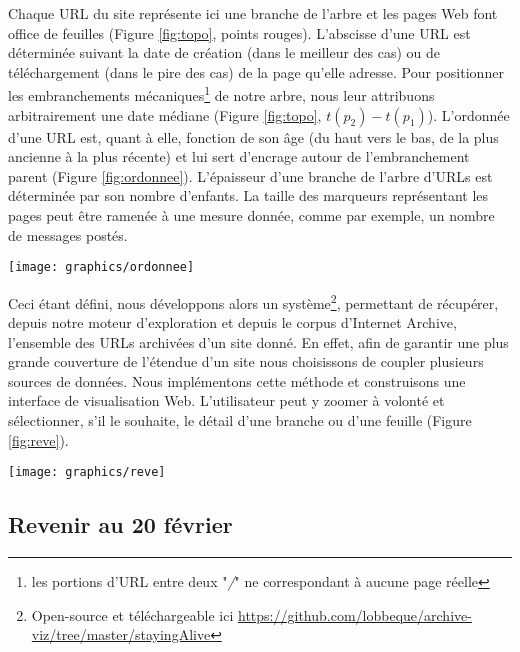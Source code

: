 \documentclass[symmetric,justified,marginals=raggedouter]{tufte-book}
\begin{document}
\noindent Chaque URL du site représente ici une branche de l'arbre et les pages Web font office de feuilles (Figure \ref{fig:topo}, points rouges). L'abscisse d'une URL est déterminée suivant la date de création (dans le meilleur des cas) ou de téléchargement (dans le pire des cas) de la page qu'elle adresse. Pour positionner les embranchements mécaniques\footnote{les portions d'URL entre deux "\textit{/}" ne correspondant à aucune page réelle} de notre arbre, nous leur attribuons arbitrairement une date médiane (Figure \ref{fig:topo}, $t(p_2) - t(p_1)$). L'ordonnée d'une URL est, quant à elle, fonction de son âge (du haut vers le bas, de la plus ancienne à la plus récente) et lui sert d'encrage autour de l'embranchement parent (Figure \ref{fig:ordonnee}). L'épaisseur d'une branche de l'arbre d'URLs est déterminée par son nombre d'enfants. La taille des marqueurs représentant les pages peut être ramenée à une mesure donnée, comme par exemple, un nombre de messages postés.

\begin{marginfigure}%
  \texttt{[image: graphics/ordonnee]}
  \vspace*{0.2cm}  
  \caption{Positionnement de 3 pages (rouge) autour d'un embranchement parent (bleu)}
  \label{fig:ordonnee}
\end{marginfigure} 

Ceci étant défini, nous développons alors un système\footnote{Open-source et téléchargeable ici \url{https://github.com/lobbeque/archive-viz/tree/master/stayingAlive}}, permettant de récupérer, depuis notre moteur d'exploration et depuis le corpus d'Internet Archive, l'ensemble des URLs archivées d'un site donné. En effet, afin de garantir une plus grande couverture de l'étendue d'un site nous choisissons de coupler plusieurs sources de données. Nous implémentons cette méthode et construisons une interface de visualisation Web. L'utilisateur peut y zoomer à volonté et sélectionner, s'il le souhaite, le détail d'une branche ou d'une feuille (Figure \ref{fig:reve}).

\begin{figure*}
  \texttt{[image: graphics/reve]}
  \caption{Capture d'écran de l'évolution topologique de la section \textit{Interprétation des rêves, roqya, djinn} du forum de \textit{yabiladi.com}}
  \label{fig:reve}
\end{figure*}

\subsection{Revenir au 20 février}
\end{document}
